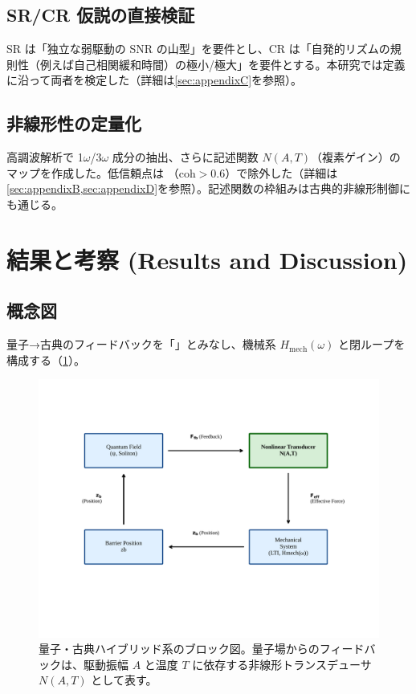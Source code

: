 \documentclass[a4paper,11pt,ja=standard,lualatex]{bxjsarticle}
\newcommand{\figref}[1]{\cref{#1}}
\newcommand{\secref}[1]{\cref{#1}}
\begin{document}
\subsection{SR/CR 仮説の直接検証}
SR は「独立な弱駆動の SNR の山型」を要件とし、CR は「自発的リズムの規則性（例えば自己相関緩和時間）の極小/極大」を要件とする\cite{Gammaitoni1998,Lindner2004}。本研究では定義に沿って両者を検定した（詳細は\secref{sec:appendixC}を参照）。

\subsection{非線形性の定量化}
高調波解析で 1$\omega$/3$\omega$ 成分の抽出、さらに記述関数 $N(A,T)$（複素ゲイン）のマップを作成した。低信頼点は （$\mathrm{coh}>0.6$）で除外した（詳細は\secref{sec:appendixB,sec:appendixD}を参照）。記述関数の枠組みは古典的非線形制御にも通じる\cite{Gelb1968,Khalil2002}。

\FloatBarrier

\section{結果と考察 (Results and Discussion)}

\subsection{概念図}
量子→古典のフィードバックを「」とみなし、機械系 $H_{\mathrm{mech}}(\omega)$ と閉ループを構成する（\figref{fig:conceptual_model}）。

\begin{figure}[H]
\centering
\includegraphics[width=\linewidth]{fig1_conceptual_model_final.pdf}
\caption{量子・古典ハイブリッド系のブロック図。量子場からのフィードバックは、駆動振幅 $A$ と温度 $T$ に依存する非線形トランスデューサ $N(A,T)$ として表す。}
\label{fig:conceptual_model}
\end{figure}
\end{document}
